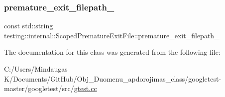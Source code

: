 \subsubsection{\texorpdfstring{premature\_exit\_filepath\_}{premature\_exit\_filepath\_}}
{\footnotesize\ttfamily const std\+::string testing\+::internal\+::\+Scoped\+Premature\+Exit\+File\+::premature\+\_\+exit\+\_\+filepath\+\_\+\hspace{0.3cm}{\ttfamily [private]}}



The documentation for this class was generated from the following file\+:\begin{DoxyCompactItemize}
\item 
C\+:/\+Users/\+Mindaugas K/\+Documents/\+Git\+Hub/\+Obj\+\_\+\+Duomenu\+\_\+apdorojimas\+\_\+class/googletest-\/master/googletest/src/\mbox{\hyperlink{googletest-master_2googletest_2src_2gtest_8cc}{gtest.\+cc}}\end{DoxyCompactItemize}
